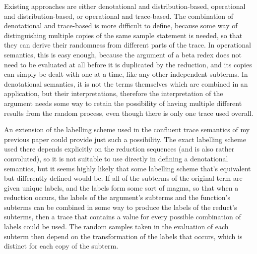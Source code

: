 \documentclass[titlepage]{article}
\begin{document}
Existing approaches are either denotational and distribution-based, operational and distribution-based, or operational and trace-based. The combination of denotational and trace-based is more difficult to define, because some way of distinguishing multiple copies of the same sample statement is needed, so that they can derive their randomness from different parts of the trace. In operational semantics, this is easy enough, because the argument of a beta redex does not need to be evaluated at all before it is duplicated by the reduction, and its copies can simply be dealt with one at a time, like any other independent subterms. In denotational semantics, it is not the terms themselves which are combined in an application, but their interpretations, therefore the interpretation of the argument needs some way to retain the possibility of having multiple different results from the random process, even though there is only one trace used overall.


 

An extension of the labelling scheme used in the confluent trace semantics of my previous paper could provide just such a possibility. The exact labelling scheme used there depends explicitly on the reduction sequences (and is also rather convoluted), so it is not suitable to use directly in defining a denotational semantics, but it seems highly likely that some labelling scheme that's equivalent but differently defined would be. If all of the subterms of the original term are given unique labels, and the labels form some sort of magma, so that when a reduction occurs, the labels of the argument's subterms and the function's subterms can be combined in some way to produce the labels of the reduct's subterms, then a trace that contains a value for every possible combination of labels could be used. The random samples taken in the evaluation of each subterm then depend on the transformation of the labels that occurs, which is distinct for each copy of the subterm.

\end{document}
